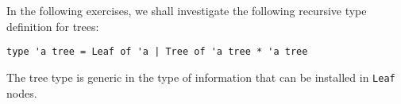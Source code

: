 In the following exercises, we shall investigate the following recursive type definition for trees:
\begin{lstlisting}
type 'a tree = Leaf of 'a | Tree of 'a tree * 'a tree
\end{lstlisting}

The tree type is generic in the type of information that can be installed in \lstinline{Leaf} nodes.
